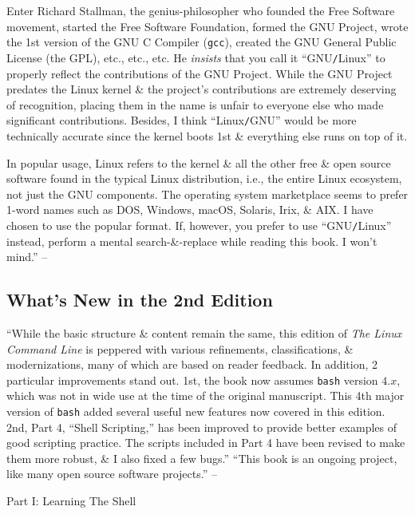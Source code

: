 \documentclass[oneside]{book}
\numberwithin{equation}{section}
\begin{document}
Enter Richard Stallman, the genius-philosopher who founded the Free Software movement, started the Free Software Foundation, formed the GNU Project, wrote the 1st version of the GNU C Compiler (\texttt{gcc}), created the GNU General Public License (the GPL), etc., etc., etc. He \textit{insists} that you call it ``GNU\texttt{/}Linux'' to properly reflect the contributions of the GNU Project. While the GNU Project predates the Linux kernel \& the project's contributions are extremely deserving of recognition, placing them in the name is unfair to everyone else who made significant contributions. Besides, I think ``Linux\texttt{/}GNU'' would be more technically accurate since the kernel boots 1st \& everything else runs on top of it.

In popular usage, Linux refers to the kernel \& all the other free \& open source software found in the typical Linux distribution, i.e., the entire Linux ecosystem, not just the GNU components. The operating system marketplace seems to prefer 1-word names such as DOS, Windows, macOS, Solaris, Irix, \& AIX. I have chosen to use the popular format. If, however, you prefer to use ``GNU\texttt{/}Linux'' instead, perform a mental search-\&-replace while reading this book. I won't mind.'' -- \cite[pp. 34--36]{Shotts2019}

\subsection*{What's New in the 2nd Edition}
``While the basic structure \& content remain the same, this edition of \textit{The Linux Command Line} is peppered with various refinements, classifications, \& modernizations, many of which are based on reader feedback. In addition, 2 particular improvements stand out. 1st, the book now assumes \texttt{bash} version $4.x$,  which was not in wide use at the time of the original manuscript. This 4th major version of \texttt{bash} added several useful new features now covered in this edition. 2nd, Part 4, ``Shell Scripting,'' has been improved to provide better examples of good scripting practice. The scripts included in Part 4 have been revised to make them more robust, \& I also fixed a few bugs.'' ``This book is an ongoing project, like many open source software projects.'' -- \cite[p 36]{Shotts2019}


\begin{center}
	\huge Part I: Learning The Shell
\end{center}
\end{document}
